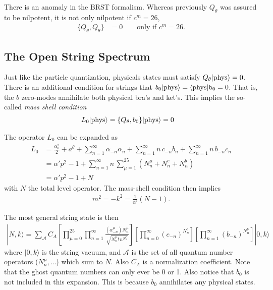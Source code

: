 \documentclass[notitlepage,amsmath,amssymb,aps, pra, 10pt]{revtex4-1}
\begin{document}
    There is an anomaly in the BRST formalism. Whereas previously $Q_{\theta}$ was assured to be nilpotent, it is not only nilpotent if $c^m = 26$,
    \begin{align}
        \{ Q_{\theta} , Q_{\theta} \} &= 0 \qquad \text{only if } c^m = 26.
    \end{align}

    \subsection{The Open String Spectrum}

        Just like the particle quantization, physicals states must satisfy $Q_{\theta}|\rm phys \rangle = 0$. There is an additional condition for strings that $b_0| \rm phys \rangle = \langle \rm phys |b_0 = 0$. That is, the $b$ zero-modes annihilate both physical bra's and ket's. This implies the so-called \emph{mass shell condition}
         \begin{align}
         L_0 | \rm phys \rangle &= \{ Q_{\theta}, b_0\}| \rm phys \rangle= 0
         \end{align}

        The operator $L_0$ can be expanded as
        \begin{align}
            L_0 &= \frac{\alpha_0^2}{2}
            +
            a^{\theta}
            +
            \sum_{n=1}^{\infty} \alpha_{-n} \alpha_n
            +
            \sum_{n=1}^{\infty}n\,c_{-n} b_n
            +
            \sum_{n=1}^{\infty}n\,b_{-n} c_n\\
            &= \alpha' p^2
            - 1
            + \sum_{n=1}^{\infty} n \, \sum_{\mu=1}^{25} \left( N_n^{\mu} + N^{c}_{n} + N^b_n\right)\\
            &= \alpha' p^2 - 1 + N
        \end{align}
        with $N$ the total level operator. The mass-shell condition then implies
        \begin{align}
            m^2 = -k^2 = \frac{1}{\alpha'}(N-1).
        \end{align}

        The most general string state is then
        \begin{align}
            |N, k\rangle = \sum_{\mathcal{A}} C_A \left[ \prod_{\mu = 0}^{25} \prod_{n=1}^{\infty} \frac{(\alpha_{-n}^{\mu}) N^{\mu}_n}{\sqrt{N_n^{\mu}! \, n^{N_n^{\mu}}}} \right]
            \left[ \prod_{n=0}^{\infty} (c_{-n})^{N^c_n} \right]
            \left[ \prod_{n=1}^{\infty} (b_{-n})^{N^b_n} \right]
            |0, k \rangle
        \end{align}
        where $|0, k \rangle$ is the string vacuum, and $\mathcal{A}$ is the set of all quantum number operators ($N_{n}^{\mu}, ...$) which sum to $N$. Also $C_A$ is a normalization coefficient. Note that the ghost quantum numbers can only ever be 0 or 1. Also notice that $b_0$ is not included in this expansion. This is because $b_0$ annihilates any physical states.
\end{document}
